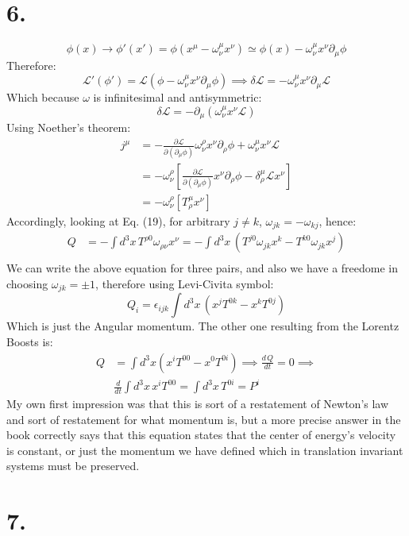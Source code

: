 \documentclass{article}
\newcommand{\pd}{\partial}  %
\newcommand{\pdm}{\partial_\mu}  %
\newcommand{\Lag}{\mathcal{L}}  %
\begin{document}
\section*{6.}
\begin{equation}
    \phi(x) \xrightarrow{} \phi'(x') = \phi(x^\mu - \omega^\mu_\nu x^\nu) \simeq \phi(x) - \omega^\mu_\nu x^\nu \pdm \phi
\end{equation}
Therefore:
\begin{equation}
    \Lag'(\phi') = \Lag(\phi-\omega^\mu_\nu x^\nu \pdm \phi) \implies \delta\Lag = -\omega^\mu_\nu x^\nu \pdm \Lag 
\end{equation}
Which because $\omega$ is infinitesimal and antisymmetric:
\begin{equation}
    \delta\Lag = - \pdm (\omega^\mu_\nu x^\nu \Lag)
\end{equation}
Using Noether's theorem:
\begin{equation}
    \begin{split}
        j^\mu &= -\frac{\pd\Lag}{\pd (\pdm \phi)}\omega^\rho_\nu x^\nu \pd_{\rho} \phi + \omega^\mu_\nu x^\nu \Lag \\
        & = -\omega^\rho_\nu \left[ \frac{\pd\Lag}{\pd (\pdm \phi)} x^\nu \pd_{\rho} \phi - \delta^\mu_\rho\Lag x^\nu \right]\\
        & = -\omega^\rho_\nu \left[ T_\rho^\mu x^\nu \right]
    \end{split}
\end{equation}
Accordingly, looking at Eq. (19), for arbitrary $j\ne k$, $\omega_{jk}=-\omega_{kj}$, hence:
\begin{equation}
    \begin{split}
        Q &= -\int d^3x \, T^{\rho 0}\omega_{\rho\nu}x^\nu = -\int d^3x \, (T^{j 0}\omega_{jk}x^k -T^{k0} \omega_{jk}x^j) \\
    \end{split}
\end{equation}
We can write the above equation for three pairs, and also we have a freedome in choosing $\omega_{jk}=\pm 1$, therefore 
using Levi-Civita symbol:
\begin{equation}
    Q_i = \epsilon_{ijk} \int d^3x \, (x^jT^{0k} - x^kT^{0j})
\end{equation}
Which is just the Angular momentum.
The other one resulting from the Lorentz Boosts is:
\begin{equation}
    \begin{split}
        Q &= \int d^3x (x^iT^{00} - x^0T^{0i}) \implies \frac{d\,Q}{dt} = 0 \implies \\
        & \frac{d}{dt}\int d^3x \, x^iT^{00} = \int d^3x \, T^{0i}  = P^i
    \end{split}
\end{equation}
My own first impression was that this is sort of a restatement of Newton's law and sort of restatement
for what momentum is, but a more precise answer in the book correctly says that this equation states 
that the center of energy's velocity is constant, or just the momentum we have defined which in 
translation invariant systems must be preserved.

\section*{7.}
\end{document}
